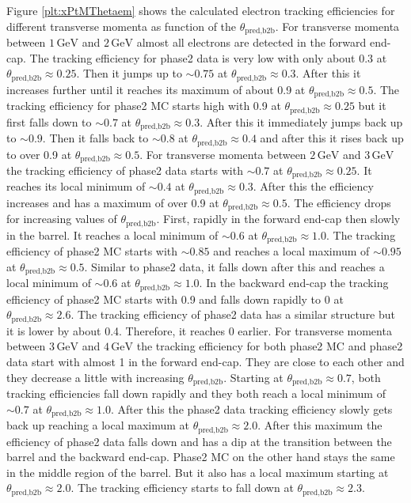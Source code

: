 \documentclass[a4paper,11pt,twosided,final,german,openbib,pdftex,listof=totoc,bibliography=totoc]{scrbook}
\begin{document}
Figure \ref{plt:xPtMThetaem} shows the calculated electron tracking efficiencies for different transverse momenta as function of the $\theta_{\textrm{pred,b2b}}$. For transverse momenta between $1\,\textrm{GeV}$ and $2\,\textrm{GeV}$ almost all electrons are detected in the forward end-cap.  The tracking efficiency for phase2 data is very low with only about 0.3 at $\theta_{\textrm{pred,b2b}} \approx 0.25$. Then it jumps up to $\sim 0.75$ at $\theta_{\textrm{pred,b2b}} \approx 0.3$. After this it increases further until it reaches its maximum of about 0.9 at $\theta_{\textrm{pred,b2b}} \approx 0.5$. The tracking efficiency for phase2 MC starts high with 0.9 at $\theta_{\textrm{pred,b2b}} \approx 0.25$ but it first falls down to $\sim 0.7$ at $\theta_{\textrm{pred,b2b}} \approx 0.3$. After this it immediately jumps back up to $\sim 0.9$. Then it falls back to $\sim 0.8$ at $\theta_{\textrm{pred,b2b}} \approx 0.4$ and after this it rises back up to over 0.9 at $\theta_{\textrm{pred,b2b}} \approx 0.5$.
For transverse momenta between $2\,\textrm{GeV}$ and $3\,\textrm{GeV}$ the tracking efficiency of phase2 data starts with $\sim 0.7$ at $\theta_{\textrm{pred,b2b}} \approx 0.25$. It reaches its local minimum of $\sim 0.4$ at $\theta_{\textrm{pred,b2b}} \approx 0.3$. After this the efficiency increases and has a maximum of over 0.9 at $\theta_{\textrm{pred,b2b}} \approx 0.5$. The efficiency drops for increasing values of $\theta_{\textrm{pred,b2b}}$. First, rapidly in the forward end-cap then slowly in the barrel. It reaches a local minimum of $\sim 0.6$ at $\theta_{\textrm{pred,b2b}} \approx 1.0$. The tracking efficiency of phase2 MC starts with $\sim  0.85$ and reaches a local maximum of $\sim 0.95$ at $\theta_{\textrm{pred,b2b}} \approx 0.5$. Similar to phase2 data, it falls down after this and reaches a local minimum of $\sim 0.6$ at $\theta_{\textrm{pred,b2b}} \approx 1.0$. In the backward end-cap the tracking efficiency of phase2 MC starts with 0.9 and falls down rapidly to 0 at $\theta_{\textrm{pred,b2b}} \approx 2.6$. The tracking efficiency of phase2 data has a similar structure but it is lower by about 0.4. Therefore, it reaches 0 earlier.
For transverse momenta between $3\,\textrm{GeV}$ and $4\,\textrm{GeV}$ the tracking efficiency for both phase2 MC and phase2 data start with almost 1 in the forward end-cap. They are close to each other and they decrease a little with increasing $\theta_{\textrm{pred,b2b}}$. Starting at $\theta_{\textrm{pred,b2b}} \approx 0.7$, both tracking efficiencies fall down rapidly and they both reach a local minimum of $\sim 0.7$ at $\theta_{\textrm{pred,b2b}} \approx 1.0$. After this the phase2 data tracking efficiency slowly gets back up reaching a local maximum at $\theta_{\textrm{pred,b2b}} \approx 2.0$. After this maximum the efficiency of phase2 data falls down and has a dip at the transition between the barrel and the backward end-cap. Phase2 MC on the other hand stays the same in the middle region of the barrel. But it also has a local maximum starting at $\theta_{\textrm{pred,b2b}} \approx 2.0$. The tracking efficiency starts to fall down at $\theta_{\textrm{pred,b2b}} \approx 2.3$.
\end{document}
